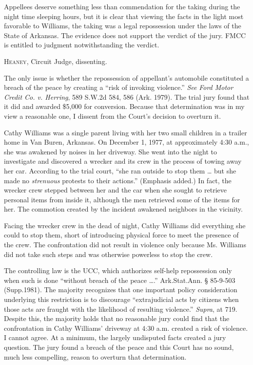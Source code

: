 Appellees deserve something less than commendation for the taking during the
night time sleeping hours, but it is clear that viewing the facts in the light
most favorable to Williams, the taking was a legal repossession under the laws
of the State of Arkansas. The evidence does not support the verdict of the
jury. FMCC is entitled to judgment notwithstanding the verdict.

\opinion \textsc{Heaney}, Circuit Judge, dissenting.

The only issue is whether the repossession of appellant's automobile constituted
a breach of the peace by creating a ``risk of invoking violence.'' \textit{See}
\textit{Ford Motor Credit Co. v. Herring}, 589 S.W.2d 584, 586 (Ark. 1979). The
trial jury found that it did and awarded \$5,000 for conversion. Because that
determination was in my view a reasonable one, I dissent from the Court's
decision to overturn it.

Cathy Williams was a single parent living with her two small children in a
trailer home in Van Buren, Arkansas. On December 1, 1977, at approximately 4:30
a.m., she was awakened by noises in her driveway. She went into the night to
investigate and discovered a wrecker and its crew in the process of towing away
her car. According to the trial court, ``she ran outside to stop them \ldots
but she made no \textit{strenuous} protests to their actions.'' (Emphasis
added.) In fact, the wrecker crew stepped between her and the car when she
sought to retrieve personal items from inside it, although the men retrieved
some of the items for her. The commotion created by the incident awakened
neighbors in the vicinity.

Facing the wrecker crew in the dead of night, Cathy Williams did everything she
could to stop them, short of introducing physical force to meet the presence of
the crew. The confrontation did not result in violence only because Ms.
Williams did not take such steps and was otherwise powerless to stop the crew.

The controlling law is the UCC, which authorizes self-help repossession only
when such is done ``without breach of the peace \ldots.'' Ark.Stat.Ann. {\S}
85-9-503 (Supp.1981). The majority recognizes that one important policy
consideration underlying this restriction is to discourage ``extrajudicial acts
by citizens when those acts are fraught with the likelihood of resulting
violence.'' \textit{Supra}, at 719. Despite this, the majority holds that no
reasonable jury could find that the confrontation in Cathy Williams' driveway
at 4:30 a.m. created a risk of violence. I cannot agree. At a minimum, the
largely undisputed facts created a jury question. The jury found a breach of
the peace and this Court has no sound, much less compelling, reason to overturn
that determination.

